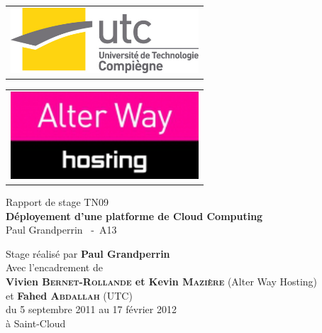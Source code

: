 \begin{titlepage}
 \begin{multicols}{2}
  \begin{flushleft}
   \begin{tabular}[l]{lrl}
    \multicolumn{3}{c}{
     \includegraphics[width=7cm]{resource/img/logo_utc}
    } \\
   \end{tabular}
  \end{flushleft}

	\begin{flushright}
		\begin{tabular}[l]{lrr}
			\multicolumn{3}{c}{
			\includegraphics[width=7cm]{resource/img/logo_awh}
			} \\
		\end{tabular}
	\end{flushright}
 \end{multicols}

 \begin{center}
  \vspace{120pt}
  \LARGE
	Rapport de stage TN09 \\
  \vspace{20pt}
  \Huge
   \textbf{Déployement d'une platforme de Cloud Computing} \\
  \vspace{20pt}
  \Large
   Paul Grandperrin ~-~A13
 \end{center}

 \vspace{160pt}
 \begin{flushright}
  \normalsize
	Stage réalisé par \textbf{Paul Grandperrin} \\
	Avec l'encadrement de \\
	\textbf{Vivien \textsc{Bernet-Rollande} et Kevin \textsc{Mazière}} (Alter Way Hosting)\\
	et \textbf{Fahed \textsc{Abdallah}} (UTC) \\
	du 5 septembre 2011 au 17 février 2012 \\
	à Saint-Cloud
 \end{flushright}
\end{titlepage}


\setcounter{page}{0}
\thispagestyle{empty}
\mbox{}
\newpage

